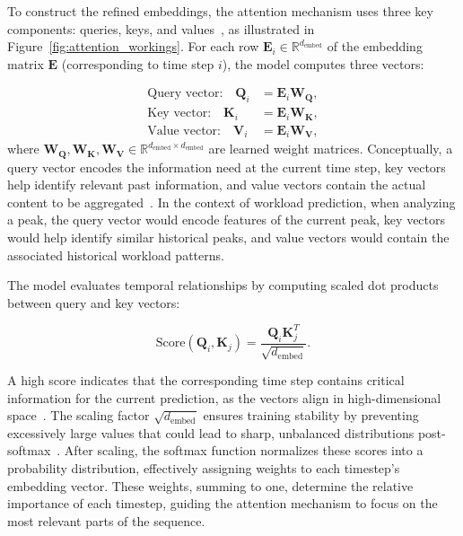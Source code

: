 To construct the refined embeddings, the attention mechanism uses three key components: queries, keys, and values~\cite{vaswani2017attention}, as illustrated in Figure~\ref{fig:attention_workings}. For each row $\mathbf{E}_i \in \mathbb{R}^{d_{\text{embed}}}$ of the embedding matrix $\mathbf{E}$ (corresponding to time step $i$), the model computes three vectors:

\begin{equation}
    \begin{aligned}
        \text{Query vector:} \quad \mathbf{Q}_i &= \mathbf{E}_i \mathbf{W_Q}, \\
        \text{Key vector:} \quad \mathbf{K}_i &= \mathbf{E}_i \mathbf{W_K}, \\
        \text{Value vector:} \quad \mathbf{V}_i &= \mathbf{E}_i \mathbf{W_V},
    \end{aligned}
\end{equation}
where $\mathbf{W_Q}, \mathbf{W_K}, \mathbf{W_V} \in \mathbb{R}^{d_{\text{embed}} \times d_{\text{embed}}}$ are learned weight matrices. Conceptually, a query vector encodes the information need at the current time step, key vectors help identify relevant past information, and value vectors contain the actual content to be aggregated~\cite{bahdanau2014neural}. In the context of workload prediction, when analyzing a peak, the query vector would encode features of the current peak, key vectors would help identify similar historical peaks, and value vectors would contain the associated historical workload patterns.

The model evaluates temporal relationships by computing scaled dot products between query and key vectors:

\begin{equation}
    \text{Score}(\mathbf{Q}_i, \mathbf{K}_j) = \frac{\mathbf{Q}_i \mathbf{K}_j^T}{\sqrt{d_{\text{embed}}}}.
\end{equation}

A high score indicates that the corresponding time step contains critical information for the current prediction, as the vectors align in high-dimensional space~\cite{luong2015effective}. The scaling factor $\sqrt{d_{\text{embed}}}$ ensures training stability by preventing excessively large values that could lead to sharp, unbalanced distributions post-softmax~\cite{xu2015show}. After scaling, the softmax function normalizes these scores into a probability distribution, effectively assigning weights to each timestep's embedding vector. These weights, summing to one, determine the relative importance of each timestep, guiding the attention mechanism to focus on the most relevant parts of the sequence.

